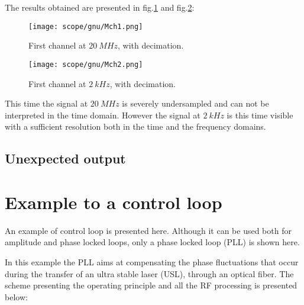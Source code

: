 \documentclass[12pt,oneside]{article}
\begin{document}
The results obtained are presented in fig.\ref{fig:gnuMoych1} and fig.\ref{fig:gnuMoych2}:

\begin{figure}[h!tb]
	\begin{center}
		\texttt{[image: scope/gnu/Mch1.png]}
		\caption{First channel at $20~MHz$, with decimation.}
		\label{fig:gnuMoych1}
	\end{center}
\end{figure}

\begin{figure}[h!tb]
	\begin{center}
		\texttt{[image: scope/gnu/Mch2.png]}
		\caption{First channel at $2~kHz$, with decimation.}
		\label{fig:gnuMoych2}
	\end{center}
\end{figure}

This time the signal at $20~MHz$ is severely undersampled and can not be interpreted in the time domain. However the signal at $2~kHz$ is this time visible with a sufficient resolution both in the time and the frequency domains.  

\subsection{Unexpected output}



\section{Example to a control loop}

An example of control loop is presented here. Although it can be used both for amplitude and phase locked loops, only a phase locked loop (PLL) is shown here.  

In this example the PLL aims at compensating the phase fluctuations that occur during the transfer of an ultra stable laser (USL), through an optical fiber. The scheme presenting the operating principle and all the RF processing is presented below:
\end{document}
